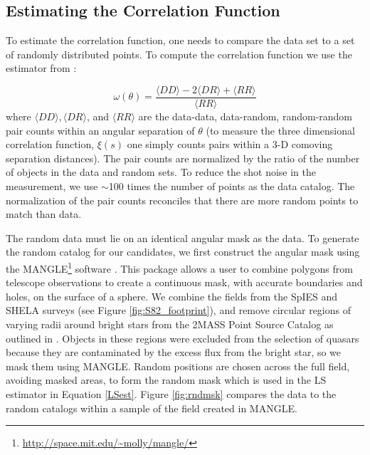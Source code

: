 \documentclass[apj, numberedappendix]{emulateapj}
\begin{document}
 \subsection{Estimating the Correlation Function}
To estimate the correlation function, one needs to compare the data set to a set of randomly distributed points. To compute the correlation function we use the estimator from \citet{Landy1993}:
 
 \begin{equation}\label{LSest}
 \omega(\theta) = \frac{\langle DD \rangle - 2 \langle DR \rangle + \langle RR \rangle}{\langle RR \rangle}
 \end{equation}
where $\langle DD \rangle, \langle DR \rangle$, and $\langle RR \rangle$ are the data-data, data-random, random-random pair counts within an angular separation of $\theta$ (to measure the three dimensional correlation function, $\xi(s)$ one simply counts pairs within a 3-D comoving separation distances). The pair counts are normalized by the ratio of the number of objects in the data and random sets. To reduce the shot noise in the measurement, we use $\sim$100 times the number of points as the data catalog. The normalization of the pair counts reconciles that there are more random points to match than data. 

The random data must lie on an identical angular mask as the data. To generate the random catalog for our candidates, we first construct the angular mask using the MANGLE\footnote{\url{http://space.mit.edu/~molly/mangle/}} software \citep{Swanson2008}. This package allows a user to combine polygons from telescope observations to create a continuous mask, with accurate boundaries and holes, on the surface of a sphere. We combine the fields from the SpIES and SHELA surveys (see Figure \ref{fig:S82_footprint}), and remove circular regions of varying radii around bright stars from the 2MASS Point Source Catalog as outlined in \citet{Timlin2016}. Objects in these regions were excluded from the selection of quasars because they are contaminated by the excess flux from the bright star, so we mask them using MANGLE. Random positions are chosen across the full field, avoiding masked areas, to form the random mask which is used in the LS estimator in Equation \ref{LSest}. Figure \ref{fig:rndmsk} compares the data to the random catalogs within a sample of the field created in MANGLE.
\end{document}

